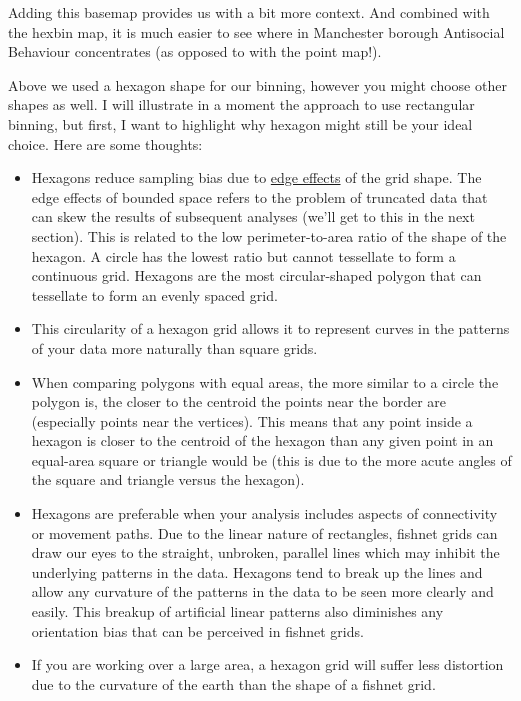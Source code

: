 \documentclass[
]{book}
\providecommand{\tightlist}{%
  \setlength{\itemsep}{0pt}\setlength{\parskip}{0pt}}
\begin{document}
Adding this basemap provides us with a bit more context. And combined with the hexbin map, it is much easier to see where in Manchester borough Antisocial Behaviour concentrates (as opposed to with the point map!).

Above we used a hexagon shape for our binning, however you might choose other shapes as well. I will illustrate in a moment the approach to use rectangular binning, but first, I want to highlight why hexagon might still be your ideal choice. Here are some thoughts:

\begin{itemize}
\tightlist
\item
  Hexagons reduce sampling bias due to \href{https://link.springer.com/chapter/10.1007/978-0-387-09688-9_5}{edge effects} of the grid shape. The edge effects of bounded space refers to the problem of truncated data that can skew the results of subsequent analyses (we'll get to this in the next section). This is related to the low perimeter-to-area ratio of the shape of the hexagon. A circle has the lowest ratio but cannot tessellate to form a continuous grid. Hexagons are the most circular-shaped polygon that can tessellate to form an evenly spaced grid.
\item
  This circularity of a hexagon grid allows it to represent curves in the patterns of your data more naturally than square grids.
\item
  When comparing polygons with equal areas, the more similar to a circle the polygon is, the closer to the centroid the points near the border are (especially points near the vertices). This means that any point inside a hexagon is closer to the centroid of the hexagon than any given point in an equal-area square or triangle would be (this is due to the more acute angles of the square and triangle versus the hexagon).
\item
  Hexagons are preferable when your analysis includes aspects of connectivity or movement paths. Due to the linear nature of rectangles, fishnet grids can draw our eyes to the straight, unbroken, parallel lines which may inhibit the underlying patterns in the data. Hexagons tend to break up the lines and allow any curvature of the patterns in the data to be seen more clearly and easily. This breakup of artificial linear patterns also diminishes any orientation bias that can be perceived in fishnet grids.
\item
  If you are working over a large area, a hexagon grid will suffer less distortion due to the curvature of the earth than the shape of a fishnet grid.

\end{itemize}
\end{document}
